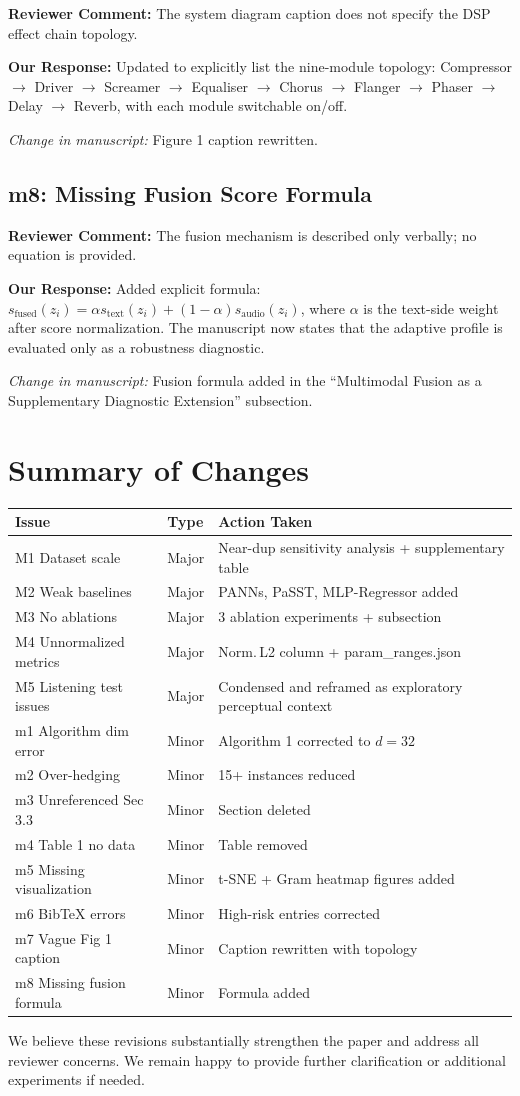 \documentclass[11pt]{article}
\newcommand{\reviewer}[1]{\textcolor{reviewercolor}{\textbf{Reviewer Comment:} #1}}
\newcommand{\response}[1]{\textcolor{responsecolor}{\textbf{Our Response:} #1}}
\newcommand{\change}[1]{\textit{Change in manuscript:} #1}
\begin{document}
\reviewer{The system diagram caption does not specify the DSP effect chain topology.}

\response{Updated to explicitly list the nine-module topology: Compressor $\to$ Driver $\to$ Screamer $\to$ Equaliser $\to$ Chorus $\to$ Flanger $\to$ Phaser $\to$ Delay $\to$ Reverb, with each module switchable on/off.}

\change{Figure 1 caption rewritten.}

\subsection*{m8: Missing Fusion Score Formula}

\reviewer{The fusion mechanism is described only verbally; no equation is provided.}

\response{Added explicit formula: $s_{\mathrm{fused}}(z_i)=\alpha s_{\mathrm{text}}(z_i)+(1-\alpha)s_{\mathrm{audio}}(z_i)$, where $\alpha$ is the text-side weight after score normalization. The manuscript now states that the adaptive profile is evaluated only as a robustness diagnostic.}

\change{Fusion formula added in the ``Multimodal Fusion as a Supplementary Diagnostic Extension'' subsection.}

\section*{Summary of Changes}

\begin{table}[h]
\centering
\small
\begin{tabular}{lll}
\toprule
\textbf{Issue} & \textbf{Type} & \textbf{Action Taken} \\
\midrule
M1 Dataset scale & Major & Near-dup sensitivity analysis + supplementary table \\
M2 Weak baselines & Major & PANNs, PaSST, MLP-Regressor added \\
M3 No ablations & Major & 3 ablation experiments + subsection \\
M4 Unnormalized metrics & Major & Norm.\,L2 column + param\_ranges.json \\
M5 Listening test issues & Major & Condensed and reframed as exploratory perceptual context \\
m1 Algorithm dim error & Minor & Algorithm 1 corrected to $d{=}32$ \\
m2 Over-hedging & Minor & 15+ instances reduced \\
m3 Unreferenced Sec 3.3 & Minor & Section deleted \\
m4 Table 1 no data & Minor & Table removed \\
m5 Missing visualization & Minor & t-SNE + Gram heatmap figures added \\
m6 BibTeX errors & Minor & High-risk entries corrected \\
m7 Vague Fig 1 caption & Minor & Caption rewritten with topology \\
m8 Missing fusion formula & Minor & Formula added \\
\bottomrule
\end{tabular}
\end{table}

We believe these revisions substantially strengthen the paper and address all reviewer concerns. We remain happy to provide further clarification or additional experiments if needed.
\end{document}
